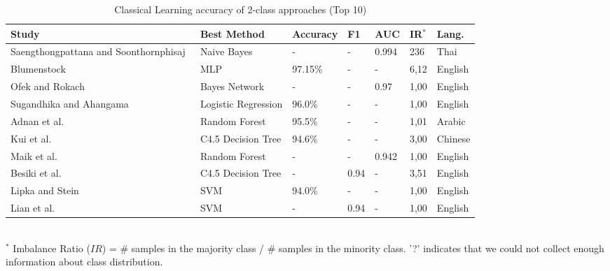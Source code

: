 \begin{table}[ht]
    \caption{Classical Learning accuracy of 2-class approaches (Top 10)}
    \label{tab:CL_performance_2class}
    \centering
    \begin{tabular}{l l l l l l l}
        \toprule
        \textbf{Study} & \textbf{Best Method} & \textbf{Accuracy} & \textbf{F1} & \textbf{AUC} & \textbf{IR$^*$} & \textbf{Lang.} \\ 
        \midrule
        Saengthongpattana and Soonthornphisaj~\cite{Saengthongpattana2014_lr169} & Naive Bayes & - & - & 0.994 & 236 & Thai \\
        Blumenstock~\cite{Blumenstock2008_lr4} & MLP & 97.15\% & - & - & 6,12 & English \\
        Ofek and Rokach~\cite{Ofek2015_lr1010} & Bayes Network & - & - & 0.97 & 1,00 & English \\
        Sugandhika and Ahangama~\cite{Sugandhika2022_lr119} & Logistic Regression & 96.0\% & - & - & 1,00 & English \\
        Adnan et al.~\cite{Yahya2020_lr2011} & Random Forest & 95.5\% & - & - & 1,01 & Arabic \\
        Kui et al.~\cite{Xiao2013_lr2030} & C4.5 Decision Tree & 94.6\% & - & - & 3,00 & Chinese \\
        Maik et al.~\cite{Anderka2011_lr35} & Random Forest & - & - & 0.942 & 1,00 & English \\
        Besiki et al.~\cite{Stvilia2005_lr1013} & C4.5 Decision Tree & - & 0.94 & - & 3,51 & English \\
        Lipka and Stein~\cite{Lipka2010_lr1019} & SVM & 94.0\% & - & - & 1,00 & English \\
        Lian et al.~\cite{Pohn2014_lr1040} & SVM & - & 0.94 & - & 1,00 & English \\
        \bottomrule
    \end{tabular}
    \\ \vspace{0.1cm}
    \footnotesize
    $^*$ Imbalance Ratio ($IR$) = \# samples in the majority class / \# samples in the minority class. '?' indicates that we could not collect enough information about class distribution.
\end{table}